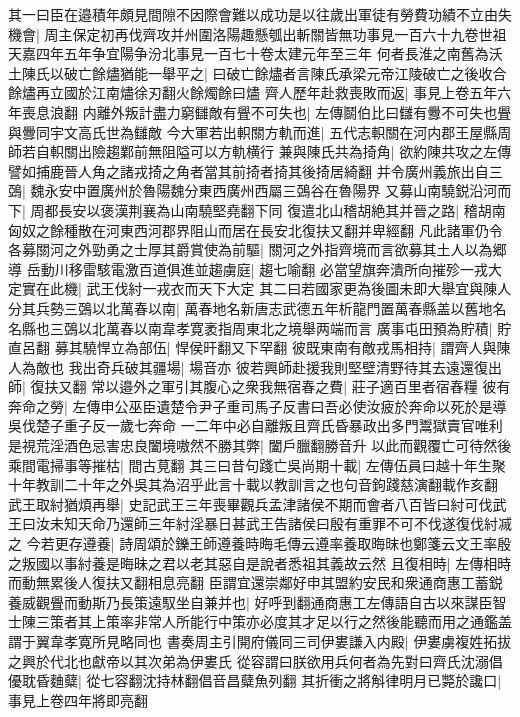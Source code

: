 其一曰臣在邉積年頗見間隙不因際會難以成功是以往歲出軍徒有勞費功績不立由失機會|{
	周主保定初再伐齊攻并州圍洛陽趣懸瓠出斬關皆無功事見一百六十九卷世祖天嘉四年五年争宜陽争汾北事見一百七十卷太建元年至三年}
何者長淮之南舊為沃土陳氏以破亡餘燼猶能一舉平之|{
	曰破亡餘燼者言陳氏承梁元帝江陵破亡之後收合餘燼再立國於江南燼徐刃翻火餘燭餘曰燼}
齊人歷年赴救喪敗而返|{
	事見上卷五年六年喪息浪翻}
内離外叛計盡力窮讎敵有舋不可失也|{
	左傳鬬伯比曰讎有釁不可失也舋與釁同宇文高氏世為讎敵}
今大軍若出軹關方軌而進|{
	五代志軹關在河内郡王屋縣周師若自軹關出險趨鄴前無阻隘可以方軌横行}
兼與陳氏共為掎角|{
	欲約陳共攻之左傳譬如捕鹿晉人角之諸戎掎之角者當其前掎者掎其後掎居綺翻}
并令廣州義旅出自三鵶|{
	魏永安中置廣州於魯陽魏分東西廣州西屬三鵶谷在魯陽界}
又募山南驍鋭沿河而下|{
	周都長安以褒漢荆襄為山南驍堅堯翻下同}
復遣北山稽胡絶其并晉之路|{
	稽胡南匈奴之餘種散在河東西河郡界阻山而居在長安北復扶又翻并卑經翻}
凡此諸軍仍令各募關河之外勁勇之士厚其爵賞使為前驅|{
	關河之外指齊境而言欲募其土人以為郷導}
岳動川移雷駭電激百道俱進並趨虜庭|{
	趨七喻翻}
必當望旗奔潰所向摧殄一戎大定實在此機|{
	武王伐紂一戎衣而天下大定}
其二曰若國家更為後圖未即大舉宜與陳人分其兵勢三鵶以北萬春以南|{
	萬春地名新唐志武德五年析龍門置萬春縣盖以舊地名名縣也三鵶以北萬春以南韋孝寛袤指周東北之境舉两端而言}
廣事屯田預為貯積|{
	貯直呂翻}
募其驍悍立為部伍|{
	悍侯旰翻又下罕翻}
彼既東南有敵戎馬相持|{
	謂齊人與陳人為敵也}
我出奇兵破其疆場|{
	場音亦}
彼若興師赴援我則堅壁清野待其去遠還復出師|{
	復扶又翻}
常以邉外之軍引其腹心之衆我無宿春之費|{
	莊子適百里者宿舂糧}
彼有奔命之勞|{
	左傳申公巫臣遺楚令尹子重司馬子反書曰吾必使汝疲於奔命以死於是導吳伐楚子重子反一歲七奔命}
一二年中必自離叛且齊氏昏暴政出多門鬻獄賣官唯利是視荒淫酒色忌害忠良闔境嗷然不勝其弊|{
	闔戶臘翻勝音升}
以此而觀覆亡可待然後乘間電掃事等摧枯|{
	間古莧翻}
其三曰昔句踐亡吳尚期十載|{
	左傳伍員曰越十年生聚十年教訓二十年之外吳其為沼乎此言十載以教訓言之也句音鉤踐慈演翻載作亥翻}
武王取紂猶煩再舉|{
	史記武王三年喪畢觀兵孟津諸侯不期而會者八百皆曰紂可伐武王曰汝未知天命乃還師三年紂淫暴日甚武王告諸侯曰殷有重罪不可不伐遂復伐紂㓕之}
今若更存遵養|{
	詩周頌於鑠王師遵養時晦毛傳云遵率養取晦昩也鄭箋云文王率殷之叛國以事紂養是晦昧之君以老其惡自是說者悉祖其義故云然}
且復相時|{
	左傳相時而動無累後人復扶又翻相息亮翻}
臣謂宜還崇鄰好申其盟約安民和衆通商惠工蓄鋭養威觀舋而動斯乃長策遠馭坐自兼并也|{
	好呼到翻通商惠工左傳語自古以來謀臣智士陳三策者其上策率非常人所能行中策亦必度其才足以行之然後能聽而用之通鑑盖謂于翼韋孝寛所見略同也}
書奏周主引開府儀同三司伊婁謙入内殿|{
	伊婁虜複姓拓拔之興於代北也獻帝以其次弟為伊婁氏}
從容謂曰朕欲用兵何者為先對曰齊氏沈溺倡優耽昏麯糵|{
	從七容翻沈持林翻倡音昌糵魚列翻}
其折衝之將斛律明月已斃於讒口|{
	事見上卷四年將即亮翻}
